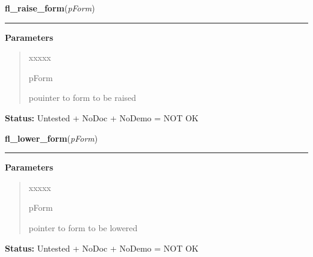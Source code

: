 \hspace{.8\funcindent}\begin{boxedminipage}{\funcwidth}

    \raggedright \textbf{fl\_raise\_form}(\textit{pForm})

    \vspace{-1.5ex}

    \rule{\textwidth}{0.5\fboxrule}
\setlength{\parskip}{2ex}
\setlength{\parskip}{1ex}
      \textbf{Parameters}
      \vspace{-1ex}

      \begin{quote}
        \begin{Ventry}{xxxxx}

          \item[pForm]

          pouinter to form to be raised

        \end{Ventry}

      \end{quote}

\textbf{Status:} Untested + NoDoc + NoDemo = NOT OK



    \end{boxedminipage}

    \label{xformslib:library:fl_lower_form}

    \vspace{0.5ex}

\hspace{.8\funcindent}\begin{boxedminipage}{\funcwidth}

    \raggedright \textbf{fl\_lower\_form}(\textit{pForm})

    \vspace{-1.5ex}

    \rule{\textwidth}{0.5\fboxrule}
\setlength{\parskip}{2ex}
\setlength{\parskip}{1ex}
      \textbf{Parameters}
      \vspace{-1ex}

      \begin{quote}
        \begin{Ventry}{xxxxx}

          \item[pForm]

          pointer to form to be lowered

        \end{Ventry}

      \end{quote}

\textbf{Status:} Untested + NoDoc + NoDemo = NOT OK



    \end{boxedminipage}

